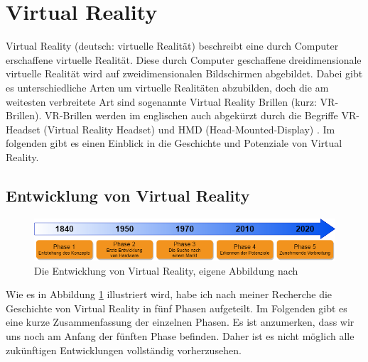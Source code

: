 \section{Virtual Reality}\label{sec:VR}
Virtual Reality (deutsch: virtuelle Realität) beschreibt eine durch Computer erschaffene virtuelle Realität. Diese durch Computer geschaffene dreidimensionale virtuelle Realität wird auf zweidimensionalen Bildschirmen abgebildet. Dabei gibt es unterschiedliche Arten um virtuelle Realitäten abzubilden, doch die am weitesten verbreitete Art sind sogenannte Virtual Reality Brillen (kurz: VR-Brillen). VR-Brillen werden im englischen auch abgekürzt durch die Begriffe VR-Headset (Virtual Reality Headset) und HMD (Head-Mounted-Display) \cite{19}. Im folgenden gibt es einen Einblick in die Geschichte und Potenziale von Virtual Reality.

\subsection{Entwicklung von Virtual Reality}\label{sec:VRGeschichte}
\begin{figure}[h]
	\centering
	\includegraphics[width=1\linewidth]{Bilder/A12_GeschichteVR}
	\caption{Die Entwicklung von Virtual Reality, eigene Abbildung nach \cite{20,21,22,23}}
	\label{fig:GeschichteVR}
\end{figure}
\noindent Wie es in Abbildung \ref{fig:GeschichteVR} illustriert wird, habe ich nach meiner Recherche die Geschichte von Virtual Reality in fünf Phasen aufgeteilt. Im Folgenden gibt es eine kurze Zusammenfassung der einzelnen Phasen. Es ist anzumerken, dass wir uns noch am Anfang der fünften Phase befinden. Daher ist es nicht möglich alle zukünftigen Entwicklungen vollständig vorherzusehen.

